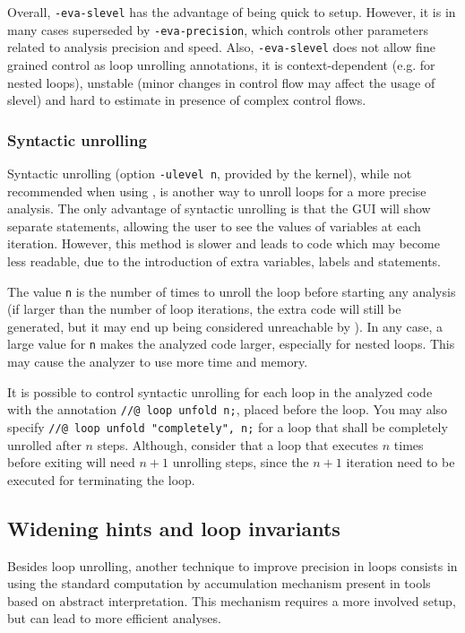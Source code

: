 \documentclass{frama-c-book}
\begin{document}
Overall, \lstinline|-eva-slevel| has the advantage of being quick to setup.
However, it is in many cases superseded by \lstinline|-eva-precision|, which
controls other parameters related to analysis precision and speed.
Also, \lstinline|-eva-slevel| does not allow fine grained control as
loop unrolling annotations,
it is context-dependent (e.g. for nested loops), unstable (minor changes in
control flow may affect the usage of slevel) and hard to estimate in presence
of complex control flows.

\subsubsection{Syntactic unrolling}

Syntactic unrolling (option \lstinline|-ulevel n|, provided by the \FramaC
kernel), while not recommended when using \Eva{}, is another way to unroll
loops for a more precise analysis. The only advantage of syntactic unrolling
is that the GUI will show separate statements, allowing
the user to see the values of variables at each iteration.
However, this method is slower and leads to code which may become less
readable, due to the introduction of extra variables, labels and statements.

The value \lstinline$n$ is the number of times to unroll the loop before starting
any analysis (if larger than the number of loop iterations, the extra code will
still be generated, but it may end up being considered unreachable by \Eva{}).
In any case, a large value for \lstinline|n| makes the analyzed code larger,
especially for nested loops. This may cause the analyzer to use more time and
memory.

It is possible to control syntactic unrolling for each loop in the analyzed code
with the annotation \lstinline|//@ loop unfold n;|, placed before the loop.
You may also specify \lstinline|//@ loop unfold "completely", n;| for a loop
that shall be completely unrolled after $n$ steps. Although, consider that
a loop that executes $n$ times before exiting will need $n+1$ unrolling steps,
since the $n+1$ iteration need to be executed for terminating the loop.

\subsection{Widening hints and loop invariants}

Besides loop unrolling, another technique to improve precision in loops
consists in using the standard computation by accumulation mechanism present in
tools based on abstract interpretation. This mechanism requires a more involved
setup, but can lead to more efficient analyses.
\end{document}
